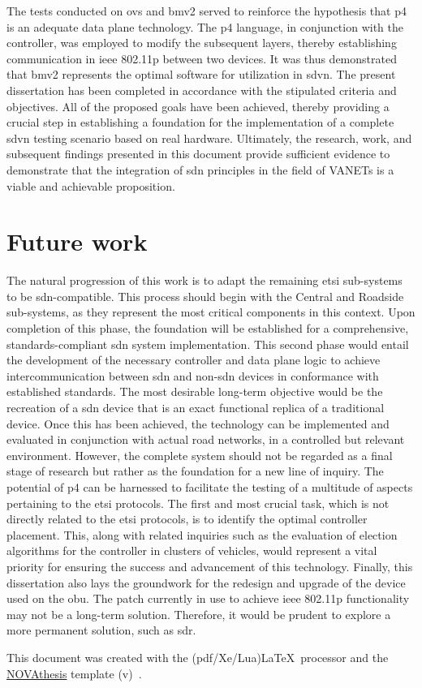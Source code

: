 The tests conducted on \gls{ovs} and \gls{bmv2} served to reinforce the hypothesis that \gls{p4} is an adequate data plane technology. The \gls{p4} language, in conjunction with the controller, was employed to modify the subsequent layers, thereby establishing communication in \gls{ieee} 802.11p between two devices. It was thus demonstrated that \gls{bmv2} represents the optimal software for utilization in \gls{sdvn}. 
The present dissertation has been completed in accordance with the stipulated criteria and objectives. All of the proposed goals have been achieved, thereby providing a crucial step in establishing a foundation for the implementation of a complete \gls{sdvn} testing scenario based on real hardware. Ultimately, the research, work, and subsequent findings presented in this document provide sufficient evidence to demonstrate that the integration of \gls{sdn} principles in the field of VANETs is a viable and achievable proposition.

\section{Future work}
The natural progression of this work is to adapt the remaining \gls{etsi} sub-systems to be \gls{sdn}-compatible. This process should begin with the Central and Roadside sub-systems, as they represent the most critical components in this context. 
Upon completion of this phase, the foundation will be established for a comprehensive, standards-compliant \gls{sdn} system implementation. This second phase would entail the development of the necessary controller and data plane logic to achieve intercommunication between \gls{sdn} and non-\gls{sdn} devices in conformance with established standards.
The most desirable long-term objective would be the recreation of a \gls{sdn} device that is an exact functional replica of a traditional device. Once this has been achieved, the technology can be implemented and evaluated in conjunction with actual road networks, in a controlled but relevant environment.
However, the complete system should not be regarded as a final stage of research but rather as the foundation for a new line of inquiry. The potential of \gls{p4} can be harnessed to facilitate the testing of a multitude of aspects pertaining to the \gls{etsi} protocols. The first and most crucial task, which is not directly related to the \gls{etsi} protocols, is to identify the optimal controller placement. This, along with related inquiries such as the evaluation of election algorithms for the controller in clusters of vehicles, would represent a vital priority for ensuring the success and advancement of this technology.
Finally, this dissertation also lays the groundwork for the redesign and upgrade of the device used on the \gls{obu}. The patch currently in use to achieve \gls{ieee} 802.11p functionality may not be a long-term solution. Therefore, it would be prudent to explore a more permanent solution, such as \gls{sdr}.


\vfill

This document was created with the (pdf/Xe/Lua)\LaTeX\ processor and the \href{https://github.com/joaomlourenco/novathesis}{NOVAthesis} template (v\novathesisversion)~\cite{novathesis-manual}.

